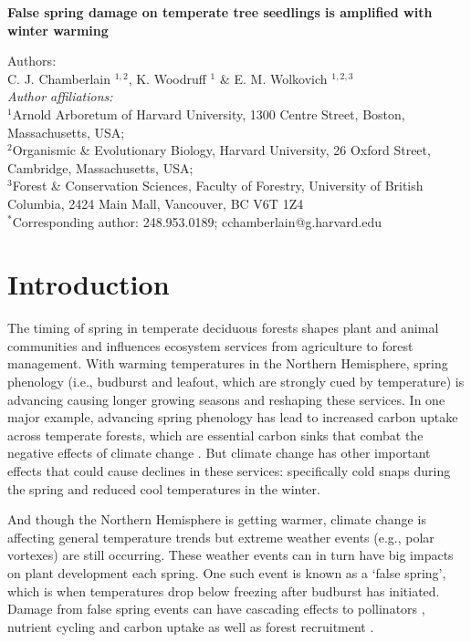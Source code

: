 \documentclass{article}\usepackage[]{graphicx}\usepackage[]{color}
\begin{document}
\noindent \textbf{\Large{False spring damage on temperate tree seedlings is amplified with winter warming}}

\noindent Authors:\\
C. J. Chamberlain $^{1,2}$, K. Woodruff $^{1}$ \& E. M. Wolkovich $^{1,2,3}$
\vspace{2ex}\\
\emph{Author affiliations:}\\
$^{1}$Arnold Arboretum of Harvard University, 1300 Centre Street, Boston, Massachusetts, USA; \\
$^{2}$Organismic \& Evolutionary Biology, Harvard University, 26 Oxford Street, Cambridge, Massachusetts, USA; \\
$^{3}$Forest \& Conservation Sciences, Faculty of Forestry, University of British Columbia, 2424 Main Mall, Vancouver, BC V6T 1Z4\\
\vspace{2ex}
$^*$Corresponding author: 248.953.0189; cchamberlain@g.harvard.edu\\

\renewcommand{\thetable}{\arabic{table}}
\renewcommand{\thefigure}{\arabic{figure}}
\renewcommand{\labelitemi}{$-$}



\section*{Introduction}
The timing of spring in temperate deciduous forests shapes plant and animal communities and influences ecosystem services from agriculture to forest management. With warming temperatures in the Northern Hemisphere, spring phenology (i.e., budburst and leafout, which  are strongly cued by temperature) is advancing causing longer growing seasons \citep{Chuine2001} and reshaping these services. In one major example, advancing spring phenology has lead to increased carbon uptake across temperate forests, which are essential carbon sinks that combat the negative effects of climate change \citep{Keenan2014}. But climate change has other important effects that could cause declines in these services: specifically cold snaps during the spring and reduced cool temperatures in the winter.
  
And though the Northern Hemisphere is getting warmer, climate change is affecting general temperature trends but extreme weather events (e.g., polar vortexes) are still occurring. These weather events can in turn have big impacts on plant development each spring. One such event is known as a `false spring', which is when temperatures drop below freezing \citep[][i.e., below -2.2$^{\circ}$C]{Schwartz2002} after budburst has initiated. Damage from false spring events can have cascading effects to pollinators \citep{Boggs2012, Pardee2017}, nutrient cycling and carbon uptake as well as forest recruitment \citep{Hufkens2012, Klosterman2018, Richardson2013}.
\end{document}
